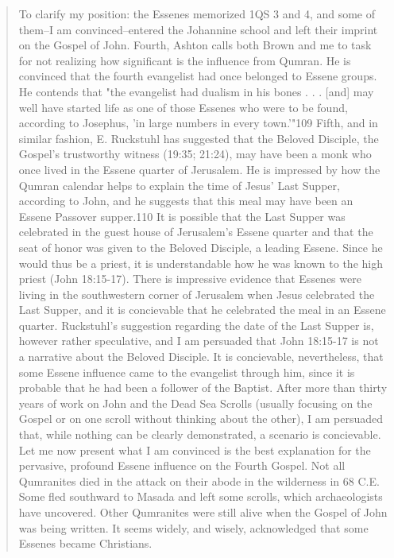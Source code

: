 \documentclass[11pt]{article}
\begin{document}
\begin{thebibliography}{37}
\begin{quote}
To clarify my position: the Essenes memorized 1QS 3 and 4, and some of them--I am convinced--entered the Johannine school and left their imprint on the Gospel of John.
Fourth, Ashton calls both Brown and me to task for not realizing how significant is the influence from Qumran. He is convinced that the fourth evangelist had once belonged to Essene groups. He contends that "the evangelist had dualism in his bones . . . [and] may well have started life as one of those Essenes who were to be found, according to Josephus, 'in large numbers in every town.'"109 
Fifth, and in similar fashion, E. Ruckstuhl has suggested that the Beloved Disciple, the Gospel's trustworthy witness (19:35; 21:24), may have been a monk who once lived in the Essene quarter of Jerusalem. He is impressed by how the Qumran calendar helps to explain the time of Jesus' Last Supper, according to John, and he suggests that this meal may have been an Essene Passover supper.110 It is possible that the Last Supper was celebrated in the guest house of Jerusalem's Essene quarter and that the seat of honor was given to the Beloved Disciple, a leading Essene. Since he would thus be a priest, it is understandable how he was known to the high priest (John 18:15-17). There is impressive evidence that Essenes were living in the southwestern corner of Jerusalem when Jesus celebrated the Last Supper, and it is concievable that he celebrated the meal in an Essene quarter. Ruckstuhl's suggestion regarding the date of the Last Supper is, however rather speculative, and I am persuaded that John 18:15-17 is not a narrative about the Beloved Disciple. It is concievable, nevertheless, that some Essene influence came to the evangelist through him, since it is probable that he had been a follower of the Baptist.
After more than thirty years of work on John and the Dead Sea Scrolls (usually focusing on the Gospel or on one scroll without thinking about the other), I am persuaded that, while nothing can be clearly demonstrated, a scenario is concievable. Let me now present what I am convinced is the best explanation for the pervasive, profound Essene influence on the Fourth Gospel. 
Not all Qumranites died in the attack on their abode in the wilderness in 68 C.E.
Some fled southward to Masada and left some scrolls, which archaeologists have uncovered. Other Qumranites were still alive when the Gospel of John was being written. It seems widely, and wisely, acknowledged that some Essenes became Christians.

\end{quote}
\end{thebibliography}
\end{document}
